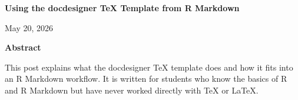 \documentclass[12pt]{article}
\newif\ifdocdesigneranon
\begin{document}
\begin{titlepage}
\thispagestyle{empty}

\vspace*{0.14\textheight}
\begin{center}


{\LARGE\bfseries Using the docdesigner TeX Template from R
Markdown\par}


\vspace{2em}

\begin{singlespace}
{\normalsize

\docdesignerauthorblock

\par\vspace{2\baselineskip}
\docdesignerseriesblock

\ifdocdesigneranon\else
\vspace{0.5em}
{\small May 20, 2026}\par
\fi

}
\end{singlespace}


\vspace{2em}

\begin{minipage}{0.8\textwidth}
\small\singlespacing
\textbf{Abstract}\par\vspace{0.25em}
This post explains what the docdesigner TeX template does and how it fits into
an R Markdown workflow. It is written for students who know the basics
of R and R Markdown but have never worked directly with TeX or LaTeX.
\end{minipage}

\vfill


\end{center}
\end{titlepage}
\fi\fi
\fi\fi
\end{document}
